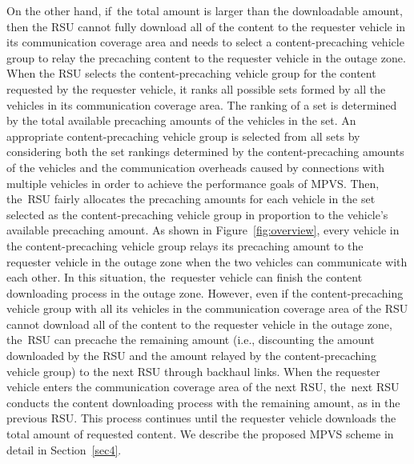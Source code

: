 \documentclass[sensors,aricle,accept,pdftex,moreauthors]{Definitions/mdpi}
\begin{document}
On the other hand, if~the total amount is larger than the downloadable amount, then the RSU cannot fully download all of the content to the requester vehicle in its communication coverage area and needs to select a content-precaching vehicle group to relay the precaching content to the requester vehicle in the outage zone.
When the RSU selects the content-precaching vehicle group for the content requested by the requester vehicle, it ranks all possible sets formed by all the vehicles in its communication coverage area.
The ranking of a set is determined by the total available precaching  amounts of the vehicles in the set. 
An appropriate content-precaching vehicle group is selected from all sets by considering both the set rankings determined by the content-precaching amounts of the vehicles and the communication overheads caused by connections with multiple vehicles in order to achieve the performance goals of MPVS.
Then, the~RSU fairly allocates the precaching amounts for each vehicle in the set selected as the content-precaching vehicle group in proportion to the vehicle's available precaching amount.
As shown in Figure~\ref{fig:overview}, every vehicle in the content-precaching vehicle group relays its precaching amount to the requester vehicle in the outage zone when the two vehicles can communicate with each other.
In this situation, the~requester vehicle can finish the content downloading process in the outage zone.
However, even if the content-precaching vehicle group with all its vehicles in the communication coverage area of the RSU cannot download all of the content to the requester vehicle in the outage zone, the~RSU can precache the remaining amount (i.e., discounting the amount downloaded by the RSU and the amount relayed by the content-precaching vehicle group) 
to the next RSU through backhaul links. 
When the requester vehicle enters the communication coverage area of the next RSU, the~next RSU conducts the content downloading process with the remaining amount, as in the previous RSU.
This process continues until the requester vehicle downloads the total amount of requested content.
We describe the proposed MPVS scheme in detail in Section~\ref{sec4}.
\end{document}
